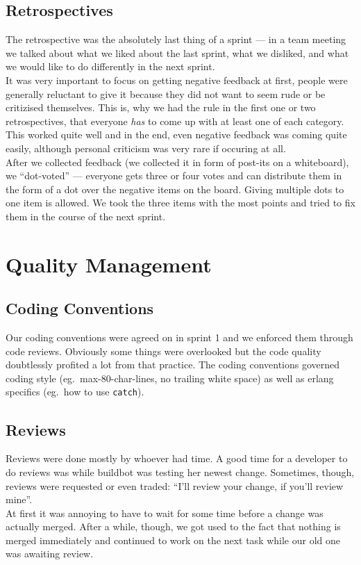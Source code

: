 \documentclass[11pt,a4paper]{report}
\begin{document}
\subsection{Retrospectives}
The retrospective was the absolutely last thing of a sprint --- in a team
meeting we talked about what we liked about the last sprint, what we disliked,
and what we would like to do differently in the next sprint. \\
It was very important to focus on getting negative feedback at first, people
were generally reluctant to give it because they did not want to seem rude or
be critizised themselves. This is, why we had the rule in the first one or two
retrospectives, that everyone {\em has\/} to come up with at least one of each
category. This worked quite well and in the end, even negative feedback was
coming quite easily, although personal criticism was very rare if occuring at
all. \\
After we collected feedback (we collected it in form of post-its on a
whiteboard), we ``dot-voted'' --- everyone gets three or four votes and can
distribute them in the form of a dot over the negative items on the board.
Giving multiple dots to one item is allowed. We took the three items with the
most points and tried to fix them in the course of the next sprint.

\section{Quality Management}
\subsection*{Coding Conventions}
Our coding conventions were agreed on in sprint 1 and we enforced them through
code reviews. Obviously some things were overlooked but the code quality
doubtlessly profited a lot from that practice.
The coding conventions governed coding style (eg.\ max-80-char-lines, no
trailing white space) as well as erlang specifics (eg.\ how to use {\tt catch}).
\subsection*{Reviews}
Reviews were done mostly by whoever had time. A good time for a developer to do
reviews was while buildbot was testing her newest change. Sometimes, though,
reviews were requested or even traded: ``I'll review your change, if you'll
review mine''. \\
At first it was annoying to have to wait for some time before a change was
actually merged. After a while, though, we got used to the fact that nothing is
merged immediately and continued to work on the next task while our old one was
awaiting review.
\end{document}
